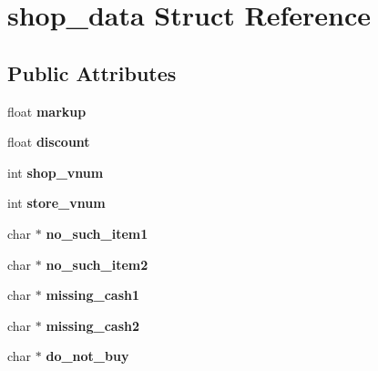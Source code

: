 \hypertarget{structshop__data}{\section{shop\-\_\-data Struct Reference}
\label{structshop__data}
}
\subsection*{Public Attributes}
\begin{DoxyCompactItemize}
\item 
\hypertarget{structshop__data_ae5066c93a9db681d20b8dee817aebb23}{float {\bfseries markup}}\label{structshop__data_ae5066c93a9db681d20b8dee817aebb23}

\item 
\hypertarget{structshop__data_aaa8ef610845d6a330c6993fb88fa1e3d}{float {\bfseries discount}}\label{structshop__data_aaa8ef610845d6a330c6993fb88fa1e3d}

\item 
\hypertarget{structshop__data_aff411fdd205015f941000f5fb060a297}{int {\bfseries shop\-\_\-vnum}}\label{structshop__data_aff411fdd205015f941000f5fb060a297}

\item 
\hypertarget{structshop__data_a5e341c298ea7232f1f53a447ce393c7b}{int {\bfseries store\-\_\-vnum}}\label{structshop__data_a5e341c298ea7232f1f53a447ce393c7b}

\item 
\hypertarget{structshop__data_a42848ea79684cd35702458db76c80cc8}{char $\ast$ {\bfseries no\-\_\-such\-\_\-item1}}\label{structshop__data_a42848ea79684cd35702458db76c80cc8}

\item 
\hypertarget{structshop__data_ac8ad8d4480d25d774cf139045fe9aa81}{char $\ast$ {\bfseries no\-\_\-such\-\_\-item2}}\label{structshop__data_ac8ad8d4480d25d774cf139045fe9aa81}

\item 
\hypertarget{structshop__data_a219bc60ee1cdb900d0c5d042791a50c1}{char $\ast$ {\bfseries missing\-\_\-cash1}}\label{structshop__data_a219bc60ee1cdb900d0c5d042791a50c1}

\item 
\hypertarget{structshop__data_a26a1ac8ac4f4b06ec12a9ad5b6af0d48}{char $\ast$ {\bfseries missing\-\_\-cash2}}\label{structshop__data_a26a1ac8ac4f4b06ec12a9ad5b6af0d48}

\item 
\hypertarget{structshop__data_a6cc84ced95b2f064fbf2595e7a5966ae}{char $\ast$ {\bfseries do\-\_\-not\-\_\-buy}}\label{structshop__data_a6cc84ced95b2f064fbf2595e7a5966ae}


\end{DoxyCompactItemize}

